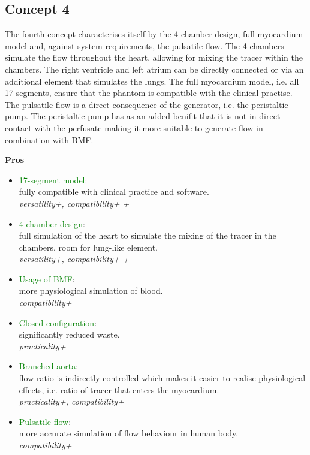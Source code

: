 \subsection{Concept 4}
The fourth concept characterises itself by the 4-chamber design, full myocardium model and, against system requirements, the pulsatile flow. The 4-chambers simulate the flow throughout the heart, allowing for mixing the tracer within the chambers. The right ventricle and left atrium can be directly connected or via an additional element that simulates the lungs. The full myocardium model, i.e. all 17 segments, ensure that the phantom is compatible with the clinical practise. The pulsatile flow is a direct consequence of the generator, i.e. the peristaltic pump. The peristaltic pump has as an added benifit that it is not in direct contact with the perfusate making it more suitable to generate flow in combination with BMF.
\begin{minipage}[t]{0.5\textwidth}
\centering\textbf{Pros}
\begin{itemize} [noitemsep]
	\item \textcolor{green}{17-segment model}: \\ fully compatible with clinical practice and software. \\ \textit{versatility+, compatibility+ +} 
	\item \textcolor{green}{4-chamber design}: \\ full simulation of the heart to simulate the mixing of the tracer in the chambers, room for lung-like element. \\ \textit{ versatility+, compatibility+ +}
	\item \textcolor{green}{Usage of BMF}: \\ more physiological simulation of blood. \\ \textit{compatibility+}
	\item \textcolor{green}{Closed configuration}: \\ significantly reduced waste. \\ \textit{practicality+}
	\item \textcolor{green}{Branched aorta}: \\ flow ratio is indirectly controlled which makes it easier to realise physiological effects, i.e. ratio of tracer that enters the myocardium. \\ \textit{practicality+, compatibility+}
	\item \textcolor{green}{Pulsatile flow}: \\ more accurate simulation of flow behaviour in human body. \\ \textit{compatibility+}
	
\end{itemize}
\end{minipage}%
